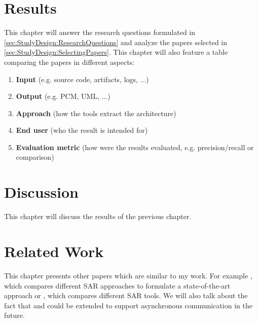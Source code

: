 \section{Results}
\label{cha:Results}
This chapter will answer the research questions formulated in \ref{sec:StudyDesign:ResearchQuestions} and analyze the papers selected in \ref{sec:StudyDesign:SelectingPapers}.
This chapter will also feature a table comparing the papers in different aspects:
\begin{enumerate}
	\item \textbf{Input} (e.g. source code, artifacts, logs, ...)
	\item \textbf{Output} (e.g. PCM, UML, ...)
	\item \textbf{Approach} (how the tools extract the architecture)
	\item \textbf{End user} (who the result is intended for)
	\item \textbf{Evaluation metric} (how were the results evaluated, e.g. precision/recall or comparison)
\end{enumerate}

\section{Discussion}
\label{cha:Discussion}
This chapter will discuss the results of the previous chapter.

\section{Related Work}
\label{cha:RelatedWork}
This chapter presents other papers which are similar to my work.
For example \cite{Ducasse2009}, which compares different SAR approaches to formulate a state-of-the-art approach or \cite{Garcia2013comparative}, which compares different SAR tools.
We will also talk about the fact that \cite{Granchelli2017MicroART} and \cite{Langhammer2016} could be extended to support asynchronous communication in the future.




